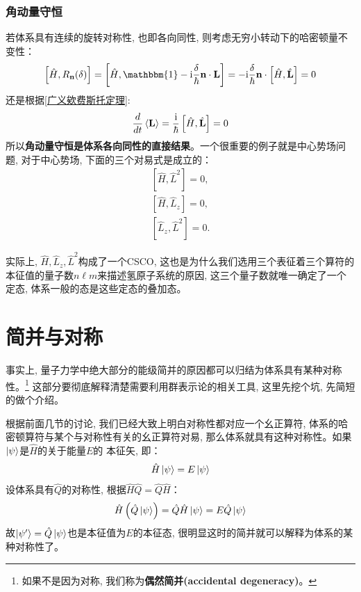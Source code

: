 \subsubsection*{角动量守恒}
若体系具有连续的旋转对称性, 也即各向同性, 则考虑无穷小转动下的哈密顿量不变性：
\begin{equation}
    \left[\hat{H},R_{\mathbf{n}}(\delta)\right]=\left[\hat H,\mathbbm{1}-\mathrm{i}\frac{\delta }{\hbar}\mathbf{n}\cdot\mathbf{L}\right]=-\mathrm i\frac{\delta}{\hbar}\mathbf{n}\cdot\left[\hat{H},\hat{\mathbf{L}}\right]=0
\end{equation}
还是根据\ref{广义欸费斯托定理}:
\begin{equation}
    \frac{d}{dt}\braket{\mathbf{L}}=\frac{\mathrm i}{\hbar}\left[\hat{H},\hat{\mathbf{L}}\right]=0
\end{equation}
所以\textbf{角动量守恒是体系各向同性的直接结果}。一个很重要的例子就是中心势场问题, 对于中心势场, 下面的三个对易式是成立的：
\begin{equation*}
    \begin{array}{l}
    {\left[\hat{H}, \hat{L}^{2}\right]=0,} \\
    {\left[\hat{H}, \hat{L}_{z}\right]=0,} \\
    {\left[\hat{L}_{z}, \hat{L}^{2}\right]=0.}
    \end{array}
\end{equation*}

实际上, $\hat{H},\hat{L}_z, \hat{L}^2$构成了一个CSCO, 这也是为什么我们选用三个表征着三个算符的本征值的量子数$n\ell m $来描述氢原子系统的原因, 这三个量子数就唯一确定了一个定态, 
体系一般的态是这些定态的叠加态。

\section{简并与对称}
事实上, 量子力学中绝大部分的能级简并的原因都可以归结为体系具有某种对称性。\footnote{如果不是因为对称, 我们称为\textbf{偶然简并(accidental degeneracy)}。}
这部分要彻底解释清楚需要利用群表示论的相关工具, 这里先挖个坑, 先简短的做个介绍。

根据前面几节的讨论, 我们已经大致上明白对称性都对应一个幺正算符, 体系的哈密顿算符与某个与对称性有关的幺正算符对易, 那么体系就具有这种对称性。如果$\ket{\psi}$是$\hat{H}$的关于能量$E$的
本征矢, 即：
\[\hat{H}\ket{\psi}=E\ket{\psi}\]
设体系具有$\hat{Q}$的对称性, 根据$\hat{H}\hat{Q}=\hat{Q}\hat{H}$：
\begin{equation}
    \label{eq:6.46}
    \hat{H}\left(\hat{Q}\ket{\psi}\right)=\hat{Q}\hat{H}\ket{\psi}=E\hat{Q}\ket{\psi}
\end{equation}
故$\ket{\psi^\prime}=\hat{Q}\ket{\psi}$也是本征值为$E$的本征态, 很明显这时的简并就可以解释为体系的某种对称性了。

